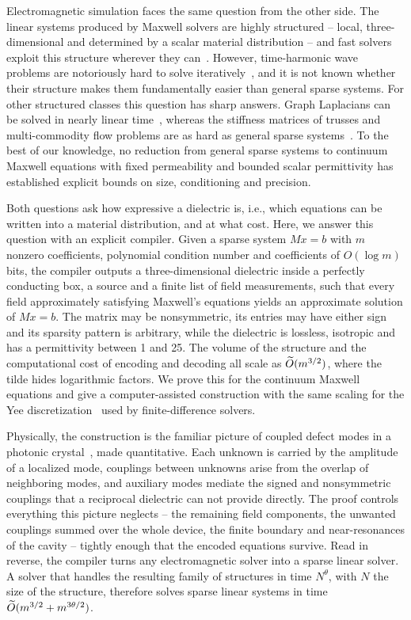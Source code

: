 Electromagnetic simulation faces the same question from the other side. The
linear systems produced by Maxwell solvers are highly structured -- local,
three-dimensional and determined by a scalar material distribution -- and fast
solvers exploit this structure wherever they
can~\citep{George1973,LiptonRoseTarjan1979,EngquistYing2011CPAM,Martinsson2019}.
However, time-harmonic wave problems are notoriously hard to solve
iteratively~\citep{ErnstGander2012,GanderZhang2019,MoiolaSpence2014}, and it
is not known whether their structure makes them fundamentally easier than
general sparse systems. For other structured classes this question has sharp
answers. Graph Laplacians can be solved in nearly linear
time~\citep{SpielmanTeng2014}, whereas the stiffness matrices of trusses and
multi-commodity flow problems are as hard as general sparse
systems~\citep{kyngzhang2017,DingKyngProbstGutenbergZhang2022,DingKyngZhang2022}.
To the best of our knowledge, no reduction from general sparse systems to
continuum Maxwell equations with fixed permeability and bounded scalar
permittivity has established explicit bounds on size, conditioning and
precision.

Both questions ask how expressive a dielectric is, i.e., which equations can be
written into a material distribution, and at what cost. Here, we answer this
question with an explicit compiler. Given a sparse system $Mx=b$ with $m$
nonzero coefficients, polynomial condition number and coefficients of
$O(\log m)$ bits, the compiler outputs a three-dimensional dielectric inside a
perfectly conducting box, a source and a finite list of field measurements,
such that every field approximately satisfying Maxwell's equations yields an
approximate solution of $Mx=b$. The matrix may be nonsymmetric, its entries may
have either sign and its sparsity pattern is arbitrary, while the dielectric is
lossless, isotropic and has a permittivity between 1 and 25. The volume of the
structure and the computational cost of encoding and decoding all scale as
$\widetilde O(m^{3/2})$, where the tilde hides logarithmic factors. We prove this for
the continuum Maxwell equations and give a computer-assisted construction with
the same scaling for the Yee discretization~\citep{yee1966} used by
finite-difference solvers.

Physically, the construction is the familiar picture of coupled defect modes
in a photonic crystal~\citep{Yariv1999,Busch2003,Joannopoulos2008}, made
quantitative. Each unknown is carried by the amplitude of a localized mode,
couplings between unknowns arise from the overlap of neighboring modes, and
auxiliary modes mediate the signed and nonsymmetric couplings that a
reciprocal dielectric can not provide directly. The proof controls everything
this picture neglects -- the remaining field components, the unwanted
couplings summed over the whole device, the finite boundary and near-resonances
of the cavity -- tightly enough that the encoded equations survive. Read in
reverse, the compiler turns any electromagnetic solver into a sparse linear
solver. A solver that handles the resulting family of structures in time
$N^\theta$, with $N$ the size of the structure, therefore solves sparse linear
systems in time $\widetilde O(m^{3/2}+m^{3\theta/2})$.

